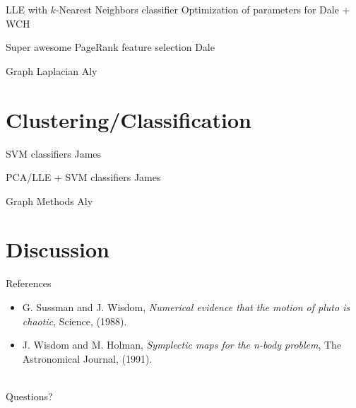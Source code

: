 \documentclass[xcolor=dvipsnames,t]{beamer} %
\begin{document}
\begin{frame}{LLE with $k$-Nearest Neighbors classifier}
Optimization of parameters for Dale + WCH
\end{frame}

\begin{frame}{Super awesome PageRank feature selection}
Dale
\end{frame}

\begin{frame}{Graph Laplacian}
Aly
\end{frame}



\section{Clustering/Classification}
\begin{frame}{SVM classifiers}
James
\end{frame}
\begin{frame}{PCA/LLE + SVM classifiers}
James
\end{frame}

\begin{frame}{Graph Methods}
Aly
\end{frame}


\section{Discussion}

\begin{frame}{References}
   \begin{itemize}
      \item G. Sussman and J. Wisdom, \emph{Numerical evidence that the motion of pluto is chaotic}, Science, (1988).\\
      \item J. Wisdom and M. Holman, \emph{Symplectic maps for the n-body problem}, The Astronomical Journal, (1991).\\
   \end{itemize}
   ~\\
   Questions?

\end{frame}
\end{document}
